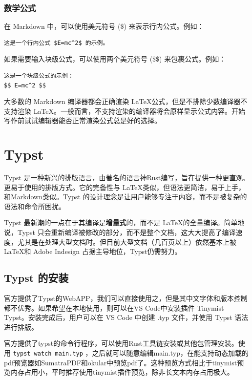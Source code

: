 \subsubsection{数学公式}

在 Markdown 中，可以使用美元符号 (\$) 来表示行内公式。例如：

\begin{verbatim}
这是一个行内公式 $E=mc^2$ 的示例。
\end{verbatim}

如果需要输入块级公式，可以使用两个美元符号 (\$\$) 来包裹公式。例如：

\begin{verbatim}
这是一个块级公式的示例：
$$ E=mc^2 $$
\end{verbatim}

大多数的 Markdown 编译器都会正确渲染 \LaTeX 公式，但是不排除少数编译器不支持渲染 \LaTeX 。一般而言，不支持渲染的编译器将会原样显示公式内容。开始写作前试试编辑器能否正常渲染公式总是好的选择。

\section{Typst}\label{sec:typst}

Typst 是一种新兴的排版语言，由著名的语言神Rust编写，旨在提供一种更直观、更易于使用的排版方式。它的完备性与 \LaTeX 类似，但语法更简洁，易于上手，和Markdown类似。Typst 的设计理念是让用户能够专注于内容，而不是被复杂的语法和命令所困扰。

Typst 最新潮的一点在于其编译是\textbf{增量式}的，而不是 \LaTeX 的全量编译。简单地说，Typst 只会重新编译被修改的部分，而不是整个文档，这大大提高了编译速度，尤其是在处理大型文档时。但目前大型文档（几百页以上）依然基本上被 \LaTeX 和 Adobe Indesign 占据主导地位，Typst仍需努力。

\subsection{Typst 的安装}

官方提供了Typst的WebAPP，我们可以直接使用之，但是其中文字体和版本控制都不优秀。如果希望在本地使用，则可以在VS Code中安装插件 Tinymist Typst。安装完成后，用户可以在 VS Code 中创建 .typ 文件，并使用 Typst 语法进行排版。

\begin{note}
  官方提供了typst的命令行程序，可以使用Rust工具链安装或其他包管理安装。使用 \texttt{typst watch main.typ} ，之后就可以随意编辑main.typ，在能支持动态加载的pdf预览器如SumatraPDF和okular中预览pdf了。这种预览方式相比于tinymist预览内存占用小，平时推荐使用tinymist插件预览，除非长文本内存占用极大。
\end{note}

